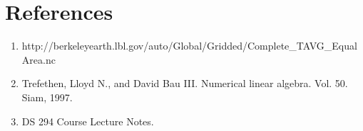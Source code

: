 \documentclass[12pt,letterpaper]{article}
\begin{document}
\section*{References}

\begin{enumerate}
	\item http://berkeleyearth.lbl.gov/auto/Global/Gridded/Complete\_TAVG\_EqualArea.nc
	\item Trefethen, Lloyd N., and David Bau III. Numerical linear algebra. Vol. 50. Siam, 1997.
	\item DS 294 Course Lecture Notes.
\end{enumerate}
\end{document}
